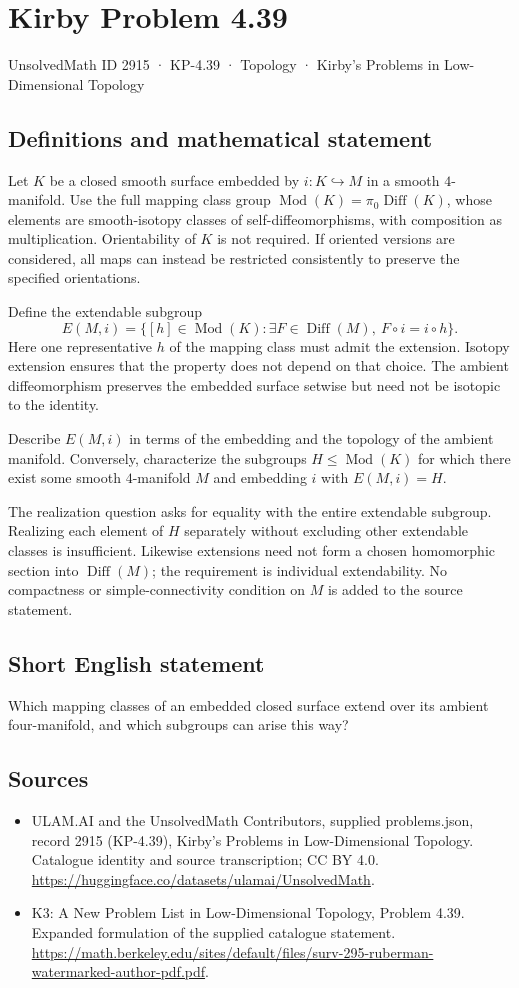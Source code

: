 \documentclass[11pt,a4paper]{article}
\begin{document}
\section*{Kirby Problem 4.39}\label{2915}
{\small UnsolvedMath ID 2915 · KP-4.39 · Topology · Kirby's Problems in Low-Dimensional Topology}
\subsection{Definitions and mathematical statement}
Let $K$ be a closed smooth surface embedded by $i:K\hookrightarrow M$
in a smooth $4$-manifold. Use the full mapping class group
$\operatorname{Mod}(K)=\pi_0\operatorname{Diff}(K)$, whose elements
are smooth-isotopy classes of self-diffeomorphisms, with composition
as multiplication. Orientability of $K$ is not required. If oriented
versions are considered, all maps can instead be restricted consistently
to preserve the specified orientations.

Define the extendable subgroup
\[
 E(M,i)=\{[h]\in\operatorname{Mod}(K):
    \exists F\in\operatorname{Diff}(M),\ F\circ i=i\circ h\}.
\]
Here one representative $h$ of the mapping class must admit the
extension. Isotopy extension ensures that the property does not depend
on that choice. The ambient diffeomorphism preserves the embedded
surface setwise but need not be isotopic to the identity.

Describe $E(M,i)$ in terms of the embedding and the topology of the
ambient manifold. Conversely, characterize the subgroups
$H\le\operatorname{Mod}(K)$ for which there exist some smooth
$4$-manifold $M$ and embedding $i$ with $E(M,i)=H$.

The realization question asks for equality with the entire extendable
subgroup. Realizing each element of $H$ separately without excluding
other extendable classes is insufficient. Likewise extensions need
not form a chosen homomorphic section into $\operatorname{Diff}(M)$;
the requirement is individual extendability. No compactness or
simple-connectivity condition on $M$ is added to the source statement.
\subsection{Short English statement}
Which mapping classes of an embedded closed surface extend over its ambient four-manifold, and which subgroups can arise this way?
\subsection{Sources}
\begin{itemize}
\item[S1] ULAM.AI and the UnsolvedMath Contributors, supplied problems.json, record 2915 (KP-4.39), Kirby's Problems in Low-Dimensional Topology. Catalogue identity and source transcription; CC BY 4.0.
\url{https://huggingface.co/datasets/ulamai/UnsolvedMath}.
\item[S2] K3: A New Problem List in Low-Dimensional Topology, Problem 4.39. Expanded formulation of the supplied catalogue statement.
\url{https://math.berkeley.edu/sites/default/files/surv-295-ruberman-watermarked-author-pdf.pdf}.
\end{itemize}
\end{document}
